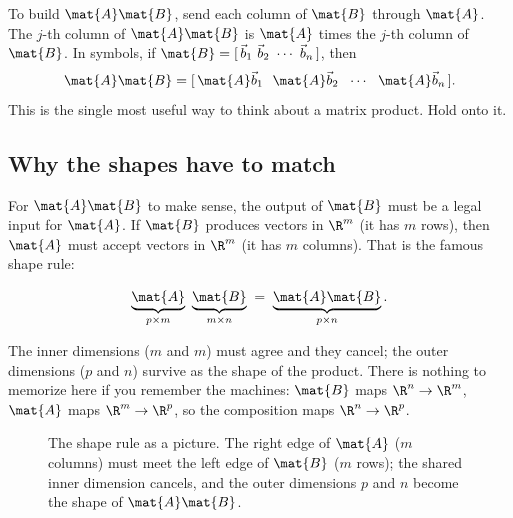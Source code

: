 \begin{focusbox}
To build $\mat{A}\mat{B}$, send each column of $\mat{B}$ through $\mat{A}$. The
$j$-th column of $\mat{A}\mat{B}$ is $\mat{A}$ times the $j$-th column of $\mat{B}$.
In symbols, if $\mat{B} = [\,\vec{b}_1 \ \vec{b}_2 \ \cdots \ \vec{b}_n\,]$, then
\[
\mat{A}\mat{B} = [\,\mat{A}\vec{b}_1 \ \ \mat{A}\vec{b}_2 \ \ \cdots \ \ \mat{A}\vec{b}_n\,].
\]
This is the single most useful way to think about a matrix product. Hold onto it.
\end{focusbox}

\subsection{Why the shapes have to match}

For $\mat{A}\mat{B}$ to make sense, the output of $\mat{B}$ must be a legal input for
$\mat{A}$. If $\mat{B}$ produces vectors in $\R^m$ (it has $m$ rows), then $\mat{A}$
must accept vectors in $\R^m$ (it has $m$ columns). That is the famous shape rule:

\[
\underbrace{\mat{A}}_{p \times m}\ \underbrace{\mat{B}}_{m \times n}
\;=\; \underbrace{\mat{A}\mat{B}}_{p \times n}.
\]

The inner dimensions ($m$ and $m$) must agree and they cancel; the outer dimensions
($p$ and $n$) survive as the shape of the product. There is nothing to memorize here
if you remember the machines: $\mat{B}$ maps $\R^n \to \R^m$, $\mat{A}$ maps
$\R^m \to \R^p$, so the composition maps $\R^n \to \R^p$.

\begin{figure}[H]
\centering
{}
\caption{The shape rule as a picture. The right edge of $\mat{A}$ ($m$ columns) must
meet the left edge of $\mat{B}$ ($m$ rows); the shared inner dimension cancels, and the
outer dimensions $p$ and $n$ become the shape of $\mat{A}\mat{B}$.}
\label{ch08:shaperule}
\end{figure}


